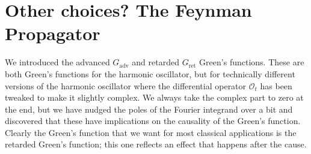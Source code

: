 \section{Other choices? The Feynman Propagator}

We introduced the advanced $G_\text{adv}$ and retarded $G_\text{ret}$ Green's functions. These are both Green's functions for the harmonic oscillator, but for technically different versions of the harmonic oscillator where the differential operator $\mathcal O_t$ has been tweaked to make it slightly complex. We always take the complex part to zero at the end, but we have nudged the poles of the Fourier integrand over a bit and discovered that these have implications on the causality of the Green's function. Clearly the Green's function that we want for most classical applications is the retarded Green's function; this one reflects an effect that happens after the cause.

